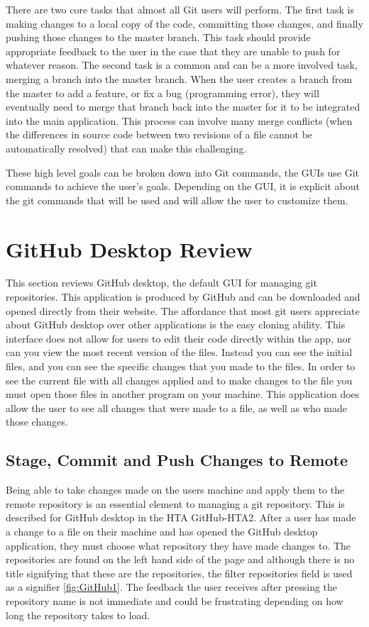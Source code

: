 \documentclass{sigchi}
\begin{document}
There are two core tasks that almost all Git users will perform. The first task is making changes to a local copy of the code,
committing those changes, and finally pushing those changes to the master branch. This task should 
provide appropriate feedback to the user in the case that they are unable to push for whatever reason.
The second task is a common and can be a more involved task, merging a branch into the master branch. 
When the user creates a branch from the master to add a feature, or fix a bug (programming error), they
will eventually need to merge that branch back into the master for it to be integrated into the main application. 
This process can involve many merge conflicts (when the differences in source code between two revisions of
a file cannot be automatically resolved) that can make this challenging.

 These high level goals can be broken down into Git commands, the GUIs use Git commands to achieve the user's goals. Depending on the GUI,
it is explicit about the git commands that will be used and will allow the user to customize them. 

\section{GitHub Desktop Review}
This section reviews GitHub desktop, the default GUI for managing git repositories.
This application is produced by GitHub and can be downloaded and opened directly from 
their website. The affordance that most git users appreciate about GitHub desktop over 
other applications is the easy cloning ability. This interface does not allow for users 
to edit their code directly within the app, nor can you view the most recent version of 
the files. Instead you can see the initial files, and you can see the specific changes
that you made to the files. In order to see the current file with all changes applied
and to make changes to the file you must open those files in another program on your 
machine. This application does allow the user to see all changes that were made to a file, 
as well as who made those changes.
 
\subsection{Stage, Commit and Push Changes to Remote}
Being able to take changes made on the users machine and apply them to the remote repository 
is an essential element to managing a git repository. This is described for GitHub desktop in
the HTA GitHub-HTA2. After a user has made a change to a file on their machine and has 
opened the GitHub desktop application, they must choose what repository they have made changes 
to. The repositories are found on the left hand side of the page and although there is no title 
signifying that these are the repositories, the filter repositories field is used as a signifier \ref{fig:GitHub1}. The feedback the user receives after pressing the repository name is not immediate and could be
frustrating depending on how long the repository takes to load. 
\end{document}
